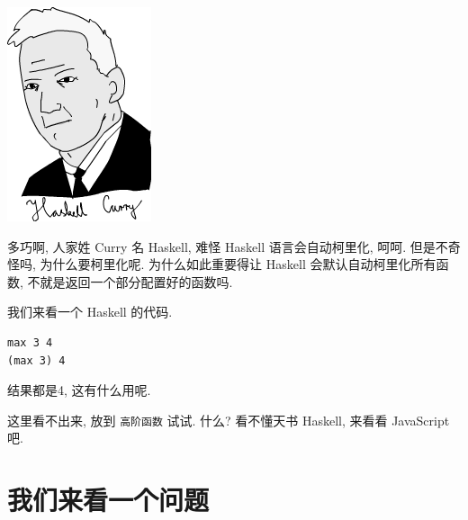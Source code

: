 \documentclass[a5paper]{book}
\begin{document}
\includegraphics[width=.9\linewidth]{./images/higherorder/curry.png}

多巧啊, 人家姓 Curry 名 Haskell, 难怪 Haskell 语言会自动柯里化, 呵呵.
但是不奇怪吗, 为什么要柯里化呢. 为什么如此重要得让 Haskell
会默认自动柯里化所有函数, 不就是返回一个部分配置好的函数吗.

我们来看一个 Haskell 的代码.

\begin{verbatim}
max 3 4
(max 3) 4
\end{verbatim}

结果都是4, 这有什么用呢.

这里看不出来, 放到 \texttt{高阶函数} 试试. 什么? 看不懂天书 Haskell, 来看看
JavaScript 吧.

\section{我们来看一个问题}
\label{sec:orgheadline16}
\end{document}
